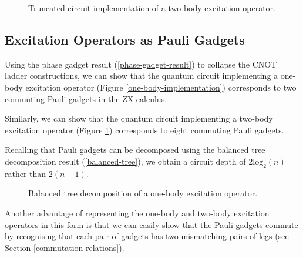\begin{figure}[H]
    \centering
    \caption{Truncated circuit implementation of a two-body excitation operator.}
    \label{two-body-implementation}
\end{figure}

\subsection{Excitation Operators as Pauli Gadgets}%
\label{excitation-operators-pauli-gadgets}

Using the phase gadget result (\ref{phase-gadget-result}) to collapse the CNOT ladder constructions, we can show that the quantum circuit implementing a one-body excitation operator (Figure \ref{one-body-implementation}) corresponds to two commuting Pauli gadgets in the ZX calculus.



Similarly, we can show that the quantum circuit implementing a two-body excitation operator (Figure \ref{two-body-implementation}) corresponds to eight commuting Pauli gadgets.


Recalling that Pauli gadgets can be decomposed using the balanced tree decomposition result (\ref{balanced-tree}), we obtain a circuit depth of $2\text{log}_2(n)$ rather than $2(n-1)$.

\begin{figure}[H]
    \centering
    \caption{Balanced tree decomposition of a one-body excitation operator.}
\end{figure}

Another advantage of representing the one-body and two-body excitation operators in this form is that we can easily show that the Pauli gadgets commute by recognising that each pair of gadgets has two mismatching pairs of legs (see Section \ref{commutation-relations}).


